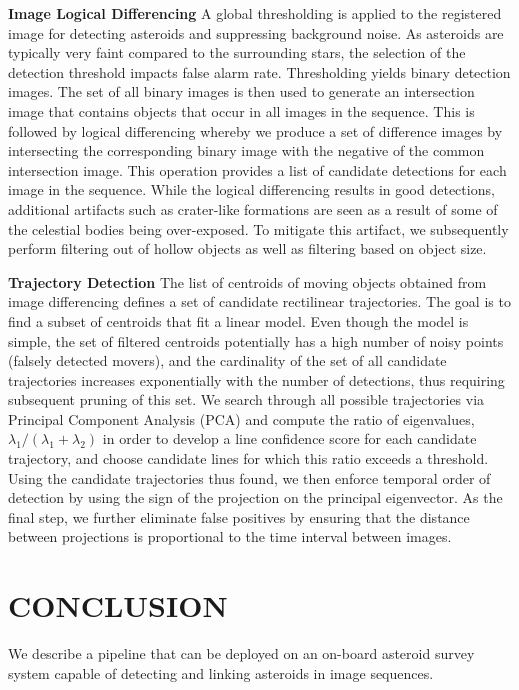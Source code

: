 \documentclass{article}
\begin{document}
{\bf Image Logical Differencing}
A global thresholding is applied to the registered image for detecting asteroids and suppressing background noise.  As asteroids are typically very faint compared to the surrounding stars, the selection of the detection threshold impacts false alarm rate.  Thresholding yields binary detection images.  The set of all binary images is then used to generate an intersection image that contains objects that occur in all images in the sequence.  This is followed by logical differencing whereby we produce a set of difference images by intersecting the corresponding binary image with the negative of the common intersection image.  This operation provides a list of candidate detections for each image in the sequence.  While the logical differencing results in good detections, additional artifacts such as crater-like formations are seen as a result of some of the celestial bodies being over-exposed.  To mitigate this artifact, we subsequently perform filtering out of hollow objects as well as filtering based on object size.

{\bf Trajectory Detection}
The list of centroids of moving objects obtained from image differencing defines a set of candidate rectilinear trajectories.  The goal is to find a subset of centroids that fit a linear model. Even though the model is simple, the set of filtered centroids potentially has a high number of noisy points (falsely detected movers), and the cardinality of the set of all candidate trajectories increases exponentially with the number of detections, thus requiring subsequent pruning of this set.  We search through all possible trajectories via Principal Component Analysis (PCA) and compute the ratio of eigenvalues, $\lambda_{1}/(\lambda_{1}+ \lambda_{2})$ in order to develop a line confidence score for each candidate trajectory, and choose candidate lines for which this ratio exceeds a threshold. Using the candidate trajectories thus found, we then enforce temporal order of detection by using the sign of the projection on the principal eigenvector.  As the final step, we further eliminate false positives by ensuring that the distance between projections is proportional to the time interval between images.  



\section{CONCLUSION}
We describe a pipeline that can be deployed on an on-board asteroid survey system capable of detecting and linking asteroids in image sequences.
\end{document}
